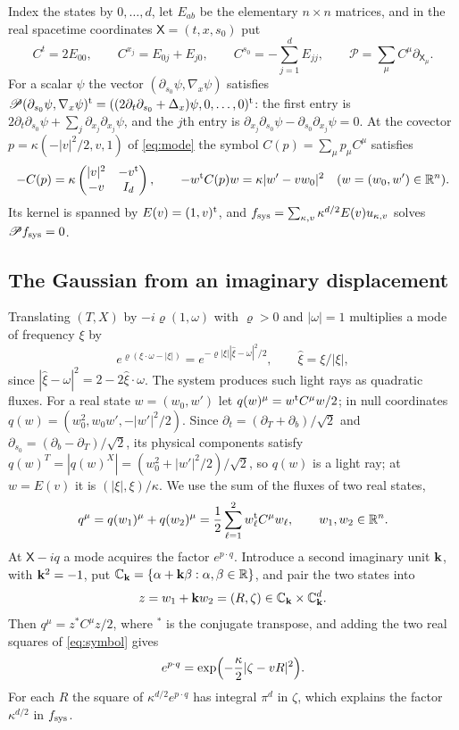 Index the states by $0,\dots,d$, let $E_{ab}$ be the elementary $n\times n$ matrices, and
in the real spacetime coordinates $\mathsf X=(t,x,s_0)$ put
\[
C^t=2E_{00},\qquad C^{x_j}=E_{0j}+E_{j0},\qquad C^{s_0}=-\sum_{j=1}^dE_{jj},\qquad
\mathscr P=\sum_\mu C^\mu\partial_{\mathsf X_\mu}.
\]
For a scalar $\psi$ the vector $(\partial_{s_0}\psi,\nabla_x\psi)$ satisfies
$\mathscr P(\partial_{s_0}\psi,\nabla_x\psi)^{\rm t}=((2\partial_t\partial_{s_0}+\Delta_x)\psi,0,\dots,0)^{\rm t}$:
the first entry is $2\partial_t\partial_{s_0}\psi+\sum_j\partial_{x_j}\partial_{x_j}\psi$, and
the $j$th entry is $\partial_{x_j}\partial_{s_0}\psi-\partial_{s_0}\partial_{x_j}\psi=0$. At the
covector $p=\kappa(-|v|^2/2,v,1)$ of \eqref{eq:mode} the symbol $C(p)=\sum_\mu p_\mu C^\mu$
satisfies
\begin{equation}\label{eq:symbol}
-C(p)=\kappa\begin{pmatrix}|v|^2&-v^{\rm t}\\-v&I_d\end{pmatrix},\qquad
-w^{\rm t}C(p)w=\kappa|w'-vw_0|^2\quad(w=(w_0,w')\in\mathbb{R}^n).
\end{equation}
Its kernel is spanned by $E(v)=(1,v)^{\rm t}$, and
$f_{\rm sys}=\sum_{\kappa,v}\kappa^{d/2}E(v)u_{\kappa,v}$ solves $\mathscr Pf_{\rm sys}=0$.

\subsection{The Gaussian from an imaginary displacement}
Translating $(T,X)$ by $-i\varrho(1,\omega)$ with $\varrho>0$ and $|\omega|=1$ multiplies a mode of
frequency $\xi$ by
\[
e^{\varrho(\xi\cdot\omega-|\xi|)}=e^{-\varrho|\xi||\hat\xi-\omega|^2/2},\qquad\hat\xi=\xi/|\xi| ,
\]
since $|\hat\xi-\omega|^2=2-2\hat\xi\cdot\omega$. The system produces such light rays as quadratic
fluxes. For a real state $w=(w_0,w')$ let $q(w)^\mu=w^{\rm t}C^\mu w/2$; in null coordinates
$q(w)=(w_0^2,w_0w',-|w'|^2/2)$. Since $\partial_t=(\partial_T+\partial_b)/\sqrt2$ and
$\partial_{s_0}=(\partial_b-\partial_T)/\sqrt2$, its physical components satisfy
$q(w)^T=|q(w)^X|=(w_0^2+|w'|^2/2)/\sqrt2$, so $q(w)$ is a light ray; at $w=E(v)$ it is
$(|\xi|,\xi)/\kappa$. We use the sum of the fluxes of two real states,
\begin{equation}\label{eq:twoflux}
q^\mu=q(w_1)^\mu+q(w_2)^\mu=\frac12\sum_{\ell=1}^2w_\ell^{\rm t}C^\mu w_\ell,\qquad w_1,w_2\in\mathbb{R}^n .
\end{equation}
At $\mathsf X-iq$ a mode acquires the factor $e^{p\cdot q}$. Introduce a second imaginary unit
$\mathbf k$, with $\mathbf k^2=-1$, put $\mathbb{C}_{\mathbf k}=\{\alpha+\mathbf k\beta:\alpha,\beta\in\mathbb{R}\}$, and pair the two states
into
\[
z=w_1+\mathbf k w_2=(R,\zeta)\in\mathbb{C}_{\mathbf k}\times\mathbb{C}_{\mathbf k}^d .
\]
Then $q^\mu=z^*C^\mu z/2$, where $^*$ is the conjugate transpose, and adding the two real
squares of \eqref{eq:symbol} gives
\begin{equation}\label{eq:gauss}
e^{p\cdot q}=\exp\Bigl(-\frac\kappa2|\zeta-vR|^2\Bigr).
\end{equation}
For each $R$ the square of $\kappa^{d/2}e^{p\cdot q}$ has integral $\pi^d$ in $\zeta$, which
explains the factor $\kappa^{d/2}$ in $f_{\rm sys}$.

